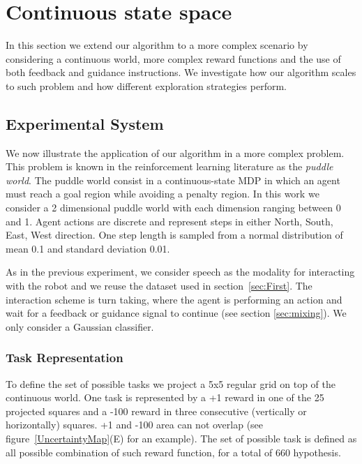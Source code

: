 \section{Continuous state space}


In this section we extend our algorithm to a more complex scenario by considering a continuous world, more complex reward functions and the use of both feedback and guidance instructions. We investigate how our algorithm scales to such problem and how different exploration strategies perform.

\subsection{Experimental System}

We now illustrate the application of our algorithm in a more complex problem. This problem is known in the reinforcement learning literature as the \emph{puddle world}. The puddle world consist in a continuous-state MDP in which an agent must reach a goal region while avoiding a penalty region.
% 
In this work we consider a 2 dimensional puddle world with each dimension ranging between 0 and 1. Agent actions are discrete and represent steps in either North, South, East, West direction. One step length is sampled from a normal distribution of mean 0.1 and standard deviation 0.01.

As in the previous experiment, we consider speech as the modality for interacting with the robot and we reuse the dataset used in section~\ref{sec:First}. The interaction scheme is turn taking, where the agent is performing an action and wait for a feedback or guidance signal to continue (see section \ref{sec:mixing}). We only consider a Gaussian classifier.

\subsubsection{Task Representation}
To define the set of possible tasks we project a 5x5 regular grid on top of the continuous world. One task is represented by a +1 reward in one of the 25 projected squares and a -100 reward in three consecutive (vertically or horizontally) squares. +1 and -100 area can not overlap (see figure~\ref{UncertaintyMap}(E) for an example). The set of possible task is defined as all possible combination of such reward function, for a total of 660 hypothesis. 

